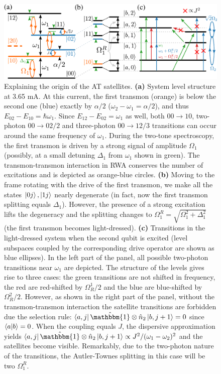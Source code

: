 \documentclass[%
 aip,
 amsmath,amssymb,
 reprint,%
]{revtex4-1}
\begin{document}
\begin{figure}
	\centering
	\includegraphics[width=.9\linewidth]{main_scheme}
	\caption{Explaining the origin of the AT satellites. \textbf{(a)} System level structure at 3.65 mA. At this current, the first transmon (orange) is below the second one (blue) exactly by $\alpha/2$ ($\omega_2 - \omega_1 = \alpha/2$), and thus $E_{02} - E_{10} = \hbar\omega_1$. Since $E_{12} - E_{02} = \omega_1$ as well, both $00\rightarrow 10$, two-photon $00 \rightarrow 02/2$ and three-photon $00\rightarrow 12/3$ transitions can occur around the same frequency of $\omega_1$. During the two-tone spectroscopy, the first transmon is driven by a strong signal of amplitude $\Omega_1$ (possibly, at a small detuning $\Delta_1$ from $\omega_1$ shown in green). The transmon-transmon interaction in RWA conserves the number of excitations and is depicted as orange-blue circles. \textbf{(b)} Moving to the frame rotating with the drive of the first transmon, we make all the states $\ket{0j},\ket{1j}$ nearly degenerate (in fact, now the first transmon splitting equals $\Delta_1$). However, the presence of a strong excitation lifts the degeneracy and the splitting changes to $\Omega_1^R = \sqrt{\Omega_1^2 + \Delta_1^2}$ (the first transmon becomes light-dressed). \textbf{(c)} Transitions in the light-dressed system when the second qubit is excited (level subspaces coupled by the corresponding drive operator are shown as blue ellipses). In the left part of the panel, all possible two-photon transitions near $\omega_1$ are depicted. The structure of the levels gives rise to three cases: the green transitions are not shifted in frequency, the red are red-shifted by $\Omega_R^1/2$ and the blue are blue-shifted by $\Omega_R^2/2$. However, as shown in the right part of the panel, without the transmon-transmon interaction the satellite transitions are forbidden due the selection rule: $\bra{a,j}\hat{\mathbbm{1}}\otimes \hat n_2 \ket{b, j+1} = 0$ since $\braket{a}{b} = 0$. When the coupling equals $J$, the dispersive approximation yields $\bra{a,j}\hat{\mathbbm{1}}\otimes \hat n_2\ket{b, j+1}\propto J^2/(\omega_1-\omega_2)^2$ and the satellites become visible. Remarkably, due to the two-photon nature of the transitions, the Autler-Townes splitting in this case will be two $\Omega_1^R$.}
	\label{fig:main_scheme}
\end{figure}
\end{document}

